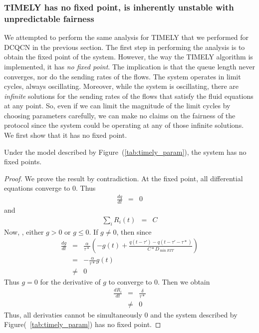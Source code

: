 \subsubsection{TIMELY has no fixed point, is inherently unstable with
unpredictable fairness}
We attempted to perform the same analysis for TIMELY that we performed for DCQCN
in the previous section.  The first step in performing the analysis is to obtain
the fixed point of the system.  However, the way the TIMELY algorithm is
implemented, it has \emph{no fixed point}. The implication is that the queue
length never converges, nor do the sending rates of the flows. The system
operates in limit cycles, always oscillating. Moreover, while the system is
oscillating, there are \emph{infinite} solutions for the sending rates of the
flows that satisfy the fluid equations at any point. So, even if we can limit
the magnitude of the limit cycles by choosing parameters carefully, we can make
no claims on the fairness of the protocol since the system could be operating at
any of those infinite solutions. We first show that it has no fixed point.

\begin{thm} 
\label{thm:nofixed}
Under the model described by Figure~(\ref{tab:timely_param}), the system has no
fixed points.
\end{thm}
\begin{proof}
We prove the result by contradiction. At the fixed point, all
differential equations converge to 0. Thus
\begin{eqnarray*}
\frac{dq}{dt} & =& 0 
\end{eqnarray*}  and 
\begin{eqnarray*} \sum_{i} R_i(t) & = & C \end{eqnarray*}
Now, , either $g > 0$ or $g  \le 0$. If $g \ne 0$, then since 
\begin{eqnarray*}
\frac{{dg}}{{dt}} & = & \frac{\alpha }{{\tau *}}( - g(t) + \frac{{q(t
                        - \tau ') - q(t - \tau ' - \tau
                        *)}}{{C*{D_{\min RTT}}}})\\
& = &  -\frac{\alpha }{{\tau *}} g(t)  \\
& \ne & 0 
\end{eqnarray*}
Thus $ g = 0$ for the derivative of  $g$ to converge to 0. Then we obtain
\begin{eqnarray*}
 \frac{dR_i}{dt} & = & \frac{\delta }{{\tau *}}\\
& \ne & 0
\end{eqnarray*}
Thus, all derivaties cannot be simultaneously 0 and the system
described by Figure(~\ref{tab:timely_param}) has no fixed point.
\end{proof}

